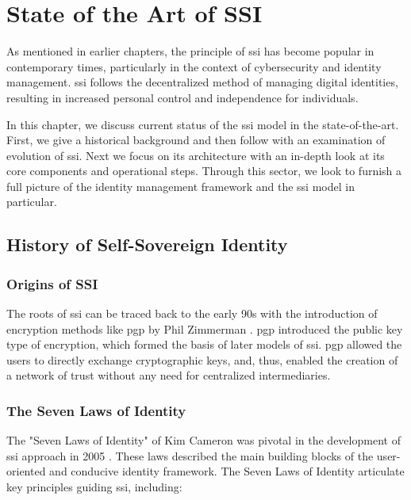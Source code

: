\chapter{State of the Art of SSI} \label{ch:ssi}

As mentioned in earlier chapters, the principle of \gls{ssi} has become popular in contemporary times, particularly in the context of cybersecurity and 
identity management. \gls{ssi} follows the decentralized method of managing digital identities, resulting in increased personal control and independence for individuals. 

In this chapter, we discuss current status of the \gls{ssi} model in the state-of-the-art. First, we give a historical background and then follow with an examination of evolution 
of \gls{ssi}. Next we focus on its architecture with an in-depth look at its core components and operational steps. Through this sector, we look to furnish a full picture of the 
identity management framework and the \gls{ssi} model in particular.

\section{History of Self-Sovereign Identity}

\subsection{Origins of SSI}

The roots of \gls{ssi} can be traced back to the early 90s with the introduction of encryption methods like \gls{pgp} by Phil 
Zimmerman \cite{businessreporter}. \gls{pgp} introduced the public key type of encryption, which formed the basis of later models of \gls{ssi}. \gls{pgp} allowed the users to directly 
exchange cryptographic keys, and, thus, enabled the creation of a network of trust without any need for centralized intermediaries.

\subsection{The Seven Laws of Identity}

The "Seven Laws of Identity" of Kim Cameron was pivotal in the development of \gls{ssi} approach in 2005 \cite{8776589}. These laws described the main building blocks of the user-oriented 
and conducive identity framework. The Seven Laws of Identity articulate key principles guiding \gls{ssi}, including:

